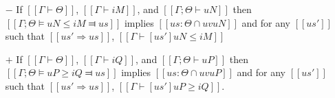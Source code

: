 \begin{theorem} \hfill
    \begin{itemize}
        \item [$-$] 
        If $[[Γ ⊢ Θ]]$, $[[Γ ⊢ iM]]$, and $[[Γ ; Θ ⊢ uN]]$ then\\ 
        $[[Γ ; Θ ⊨ uN ≤ iM ⫤ us]]$
        implies $[[us : Θ ∩ uv uN]]$ and 
        for any $[[us']]$ such that $[[us' ⇒ us]]$,
        $[[ Γ ⊢ [us']uN ≤ iM ]]$

        \item [$+$] 
        If $[[Γ ⊢ Θ]]$, $[[Γ ⊢ iQ]]$, and $[[Γ ; Θ ⊢ uP]]$ then\\
        $[[Γ ; Θ ⊨ uP ≥ iQ ⫤ us]]$
        implies $[[us : Θ ∩ uv uP]]$ and 
        for any $[[us']]$ such that $[[us' ⇒ us]]$,
        $[[ Γ ⊢ [us']uP ≥ iQ ]]$.
     \end{itemize}
\end{theorem}
